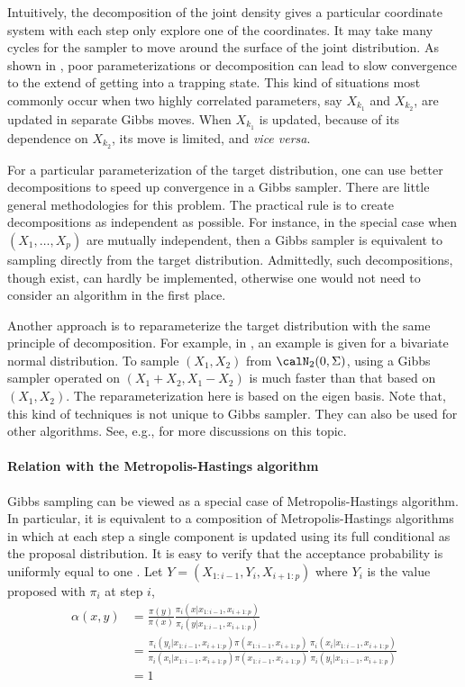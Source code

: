 Intuitively, the decomposition of the joint density gives a particular
coordinate system with each step only explore one of the coordinates. It may
take many cycles for the sampler to move around the surface of the joint
distribution. As shown in \cite[][note.~9.7.1]{Robert:2004tn}, poor
parameterizations or decomposition can lead to slow convergence to the extend
of getting into a trapping state. This kind of situations most commonly occur
when two highly correlated parameters, say $X_{k_1}$ and $X_{k_2}$, are
updated in separate Gibbs moves. When $X_{k_1}$ is updated, because of its
dependence on $X_{k_2}$, its move is limited, and \emph{vice versa}.

For a particular parameterization of the target distribution, one can use
better decompositions to speed up convergence in a Gibbs sampler. There are
little general methodologies for this problem. The practical rule is to create
decompositions as independent as possible. For instance, in the special case
when $(X_1,\dots,X_p)$ are mutually independent, then a Gibbs sampler is
equivalent to sampling directly from the target distribution. Admittedly, such
decompositions, though exist, can hardly be implemented, otherwise one would
not need to consider an \mcmc algorithm in the first place.

Another approach is to reparameterize the target distribution with the same
principle of decomposition. For example, in
\cite[][sec.~10.4.1]{Robert:2004tn}, an example is given for a bivariate
normal distribution. To sample $(X_1,X_2)$ from $\calN_2(0, \Sigma)$, using a
Gibbs sampler operated on $(X_1 + X_2, X_1 - X_2)$ is much faster than that
based on $(X_1,X_2)$. The reparameterization here is based on the eigen basis.
Note that, this kind of techniques is not unique to Gibbs sampler. They can
also be used for other \mcmc algorithms. See, e.g.,
\cite{Hills:1993vb,Gilks:1996vx} for more discussions on this topic.

\paragraph{Relation with the Metropolis-Hastings algorithm}

Gibbs sampling can be viewed as a special case of Metropolis-Hastings
algorithm. In particular, it is equivalent to a composition of
Metropolis-Hastings algorithms in which at each step a single component is
updated using its full conditional as the proposal distribution. It is easy to
verify that the acceptance probability is uniformly equal to one
\cite[][Theorem~10.13]{Robert:2004tn}. Let $Y = (X_{1:i-1},Y_i,X_{i+1:p})$
where $Y_i$ is the value proposed with $\pi_i$ at step $i$,
\begin{align*}
  \alpha(x,y) &= \frac{\pi(y)}{\pi(x)}
  \frac{\pi_i(x|x_{1:i-1},x_{i+1:p})}{\pi_i(y|x_{1:i-1},x_{i+1:p})} \\
  &= \frac{\pi_i(y_i|x_{1:i-1}, x_{i+1:p})\pi(x_{1:i-1},x_{i+1:p})}
  {\pi_i(x_i|x_{1:i-1}, x_{i+1:p})\pi(x_{1:i-1},x_{i+1:p})}
  \frac{\pi_i(x_i|x_{1:i-1}, x_{i+1:p})}{\pi_i(y_i|x_{1:i-1}, x_{i+1:p})} \\
  &= 1
\end{align*}

